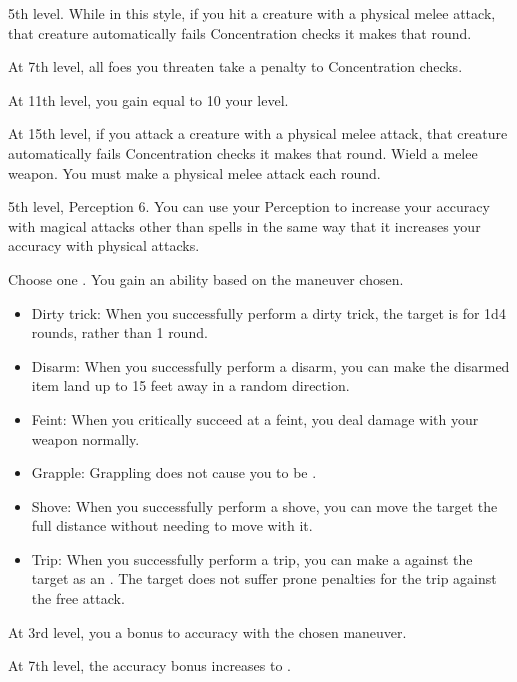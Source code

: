     \featpre 5th level.
    \featben While in this style, if you hit a creature with a physical melee attack, that creature automatically fails Concentration checks it makes that round.

    At 7th level, all foes you threaten take a  penalty to Concentration checks.

    At 11th level, you gain  equal to 10 \add your level.

    At 15th level, if you attack a creature with a physical melee attack, that creature automatically fails Concentration checks it makes that round.
    \stylereq Wield a melee weapon. You must make a physical melee attack each round.

    \featpre 5th level, Perception 6.
    \featben You can use your Perception to increase your accuracy with magical attacks other than spells in the same way that it increases your accuracy with physical attacks.

    Choose one .
    \featben You gain an ability based on the maneuver chosen.
    \begin{itemize}
        \item Dirty trick: When you successfully perform a dirty trick, the target is \impaired for 1d4 rounds, rather than 1 round.
        \item Disarm: When you successfully perform a disarm, you can make the disarmed item land up to 15 feet away in a random direction.
        \item Feint: When you critically succeed at a feint, you deal damage with your weapon normally.
        \item Grapple: Grappling does not cause you to be .
        \item Shove: When you successfully perform a shove, you can move the target the full distance without needing to move with it.
        \item Trip: When you successfully perform a trip, you can make a  against the target as an . The target does not suffer prone penalties for the trip against the free attack.
    \end{itemize}

    At 3rd level, you a  bonus to accuracy with the chosen maneuver.

    At 7th level, the accuracy bonus increases to .

